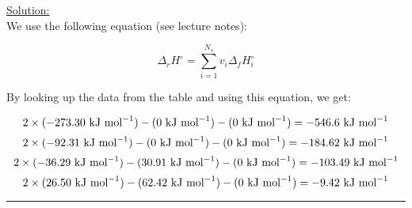 \noindent
\underline{Solution:}\\

We use the following equation (see lecture notes):

$$\Delta_r H^\circ = \sum\limits_{i=1}^{N_s}v_i\Delta_fH_i^\circ$$

By looking up the data from the table and using this equation, we get:

$$2 \times (-273.30\textnormal{ kJ mol}^{-1}) - (0\textnormal{ kJ mol}^{-1}) - (0\textnormal{ kJ mol}^{-1})= -546.6\textnormal{ kJ mol}^{-1}$$
$$2 \times (-92.31\textnormal{ kJ mol}^{-1}) - (0\textnormal{ kJ mol}^{-1}) - (0\textnormal{ kJ mol}^{-1}) = -184.62\textnormal{ kJ mol}^{-1}$$
$$2 \times (-36.29\textnormal{ kJ mol}^{-1}) - (30.91\textnormal{ kJ mol}^{-1}) - (0\textnormal{ kJ mol}^{-1}) = -103.49\textnormal{ kJ mol}^{-1}$$
$$2 \times (26.50\textnormal{ kJ mol}^{-1}) - (62.42\textnormal{ kJ mol}^{-1}) - (0\textnormal{ kJ mol}^{-1}) = -9.42\textnormal{ kJ mol}^{-1}$$

\hrule\vspace{0.5cm}
